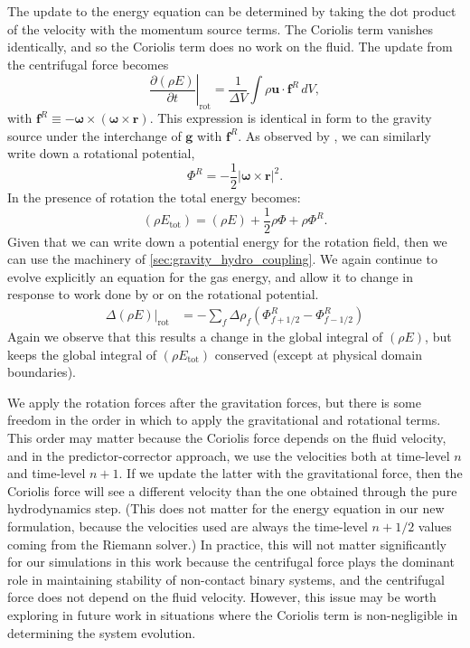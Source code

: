 \documentclass[iop]{../emulateapj}
\begin{document}
The update to the energy equation can be determined by taking the dot product of the velocity
with the momentum source terms. The Coriolis term vanishes identically, and so
the Coriolis term does no work on the fluid. The update from the centrifugal force becomes
\begin{equation}
  \left.\frac{\partial(\rho E)}{\partial t}\right|_{\text{rot}} = \frac{1}{\Delta V}\int \rho \mathbf{u} \cdot \mathbf{f}^R\, dV,
\end{equation}
with $\mathbf{f}^R \equiv  -{\bm\omega} \times \left({\bm\omega} \times \mathbf{r}\right)$. 
This expression is identical in form to the gravity source under the interchange of $\mathbf{g}$ with $\mathbf{f}^R$.
As observed by \cite{marcello:2012}, we can similarly write down a rotational potential,
\begin{equation}
  \Phi^R = -\frac{1}{2} \left| {\bm\omega} \times \mathbf{r} \right|^2.
\end{equation}
In the presence of rotation the total energy becomes:
\begin{equation}
  (\rho E_{\text{tot}}) = (\rho E) + \frac{1}{2} \rho \Phi + \rho \Phi^R.
\end{equation}
Given that we can write down a potential energy for the rotation field, then we can use the machinery of 
\autoref{sec:gravity_hydro_coupling}. We again continue to evolve explicitly an equation for 
the gas energy, and allow it to change in response to work done by or on the rotational potential.
\begin{align}
  \left.\Delta(\rho E)\right|_{\text{rot}} &= - \sum_{f} \Delta \rho_{f} (\Phi^R_{f+1/2} - \Phi^R_{f-1/2})
\end{align}
Again we observe that this results a change in the global integral of $(\rho E)$, but keeps 
the global integral of $(\rho E_{\text{tot}})$ conserved (except at physical domain boundaries).

We apply the rotation forces after the gravitation forces, but 
there is some freedom in the order in which to apply the gravitational and rotational terms.
This order may matter because the Coriolis force depends on the fluid velocity, and 
in the predictor-corrector approach, we use the velocities both at 
time-level $n$ and time-level $n+1$. If we update the latter with the gravitational force, 
then the Coriolis force will see a different velocity than the one obtained through the 
pure hydrodynamics step. (This does not matter for the energy equation in our new formulation,
because the velocities used are always the time-level $n+1/2$ values coming from the Riemann solver.)
In practice, this will not matter significantly for our simulations in this work 
because the centrifugal force plays the dominant role in maintaining stability of non-contact 
binary systems, and the centrifugal force does not depend on the fluid velocity.
However, this issue may be worth exploring in future work in situations where the Coriolis 
term is non-negligible in determining the system evolution.
\end{document}
